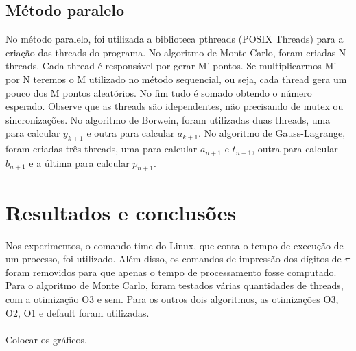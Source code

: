 \documentclass[a4paper]{article}
\begin{document}
\subsection{Método paralelo}
No método paralelo, foi utilizada a biblioteca pthreads (POSIX Threads) para 
a criação das threads do programa. No algoritmo de Monte Carlo, foram criadas N threads. 
Cada thread é responsável por gerar M' pontos. Se multiplicarmos M' por N teremos 
o M utilizado no método sequencial, ou seja, cada thread gera um pouco dos M pontos aleatórios. 
No fim tudo é somado obtendo o número esperado. Observe que as threads são idependentes, 
não precisando de mutex ou sincronizações. No algoritmo de Borwein, foram utilizadas duas threads, uma para 
calcular \begin{math}y_{k+1}\end{math} e outra para calcular \begin{math}a_{k+1}\end{math}.
No algoritmo de Gauss-Lagrange, foram criadas três threads, uma para calcular
\begin{math}a_{n+1}\end{math} e \begin{math}t_{n+1}\end{math}, outra para calcular \begin{math}b_{n+1}\end{math} e
a última para calcular \begin{math}p_{n+1}\end{math}.

\section{Resultados e conclusões}
Nos experimentos, o comando time do Linux, que conta o tempo de execução de um 
processo, foi utilizado. Além disso, os comandos de impressão dos dígitos de \begin{math}\pi\end{math} 
foram removidos para que apenas o tempo de processamento fosse computado. Para o
algoritmo de Monte Carlo, foram testados várias quantidades de threads, com a otimização
O3 e sem. Para os outros dois algoritmos, as otimizações O3, O2, O1 e default foram
utilizadas.\\\\

Colocar os gráficos.\\\\
\end{document}
